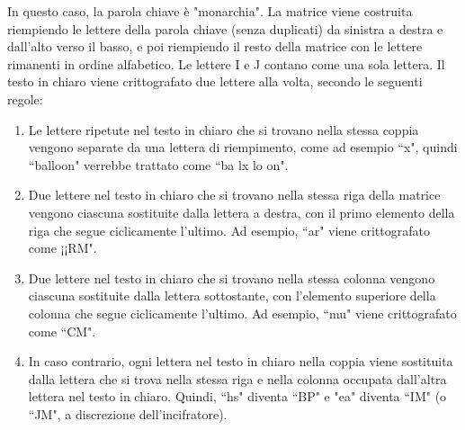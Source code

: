 \begin{center}
    \end{center}
In questo caso, la parola chiave è "monarchia". La matrice viene costruita riempiendo le lettere della parola chiave (senza duplicati) da sinistra a destra e dall'alto verso il basso, e poi riempiendo il resto della matrice con le lettere rimanenti in ordine alfabetico. Le lettere I e J contano come una sola lettera. Il testo in chiaro viene crittografato due lettere alla volta, secondo le seguenti regole:
\begin{enumerate}
    \item Le lettere ripetute nel testo in chiaro che si trovano nella stessa coppia 
    vengono separate da una lettera di riempimento, come ad esempio ``x", quindi ``balloon" 
    verrebbe trattato come ``ba lx lo on".
    \item Due lettere nel testo in chiaro che si trovano nella stessa riga della matrice
    vengono ciascuna sostituite dalla lettera a destra, con il primo elemento della riga
    che segue ciclicamente l'ultimo. Ad esempio, ``ar" viene crittografato come ¡¡RM".
    \item Due lettere nel testo in chiaro che si trovano nella stessa colonna vengono ciascuna
    sostituite dalla lettera sottostante, con l'elemento superiore della colonna che segue
    ciclicamente l'ultimo. Ad esempio, ``mu" viene crittografato come ``CM".
    \item In caso contrario, ogni lettera nel testo in chiaro nella coppia viene sostituita
    dalla lettera che si trova nella stessa riga e nella colonna occupata dall'altra lettera
    nel testo in chiaro. Quindi, ``hs" diventa ``BP" e "ea" diventa ``IM" (o ``JM", a discrezione
    dell'incifratore).
\end{enumerate}
